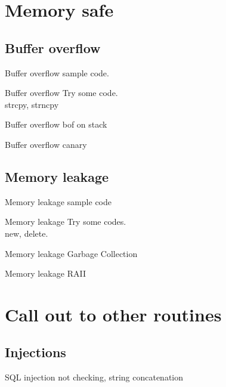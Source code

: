 \documentclass{beamer}
\begin{document}
\begin{CJK*}{UTF8}{bsmi}
    \section{Memory safe}
    \subsection{Buffer overflow}
    \begin{frame}{Buffer overflow}
        sample code.
    \end{frame}

    \begin{frame}{Buffer overflow}
        Try some code.\\
        strcpy, strncpy
    \end{frame}

    \begin{frame}{Buffer overflow}
        bof on stack
    \end{frame}

    \begin{frame}{Buffer overflow}
        canary
    \end{frame}

    \subsection{Memory leakage}
    \begin{frame}{Memory leakage}
        sample code
    \end{frame}

    \begin{frame}{Memory leakage}
        Try some codes.\\
        new, delete.
    \end{frame}

    \begin{frame}{Memory leakage}
        Garbage Collection
    \end{frame}

    \begin{frame}{Memory leakage}
        RAII
    \end{frame}

    \section{Call out to other routines}
    \subsection{Injections}
    \begin{frame}{SQL injection}
        not checking, string concatenation
    \end{frame}


\end{CJK*}
\end{document}
